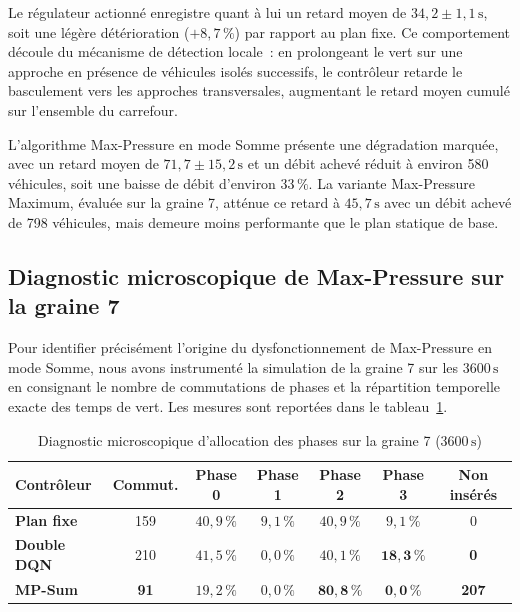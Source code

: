 \documentclass[11pt,a4paper]{article}
\begin{document}
Le régulateur actionné enregistre quant à lui un retard moyen de $34{,}2 \pm 1{,}1\,\mathrm{s}$, soit une légère détérioration ($+8{,}7\,\%$) par rapport au plan fixe. Ce comportement découle du mécanisme de détection locale~: en prolongeant le vert sur une approche en présence de véhicules isolés successifs, le contrôleur retarde le basculement vers les approches transversales, augmentant le retard moyen cumulé sur l'ensemble du carrefour.

L'algorithme Max-Pressure en mode Somme présente une dégradation marquée, avec un retard moyen de $71{,}7 \pm 15{,}2\,\mathrm{s}$ et un débit achevé réduit à environ 580 véhicules, soit une baisse de débit d'environ $33\,\%$. La variante Max-Pressure Maximum, évaluée sur la graine 7, atténue ce retard à $45{,}7\,\mathrm{s}$ avec un débit achevé de 798 véhicules, mais demeure moins performante que le plan statique de base.

\subsection{Diagnostic microscopique de Max-Pressure sur la graine 7}
\label{subsec:diagnostic}

Pour identifier précisément l'origine du dysfonctionnement de Max-Pressure en mode Somme, nous avons instrumenté la simulation de la graine 7 sur les $3600\,\mathrm{s}$ en consignant le nombre de commutations de phases et la répartition temporelle exacte des temps de vert. Les mesures sont reportées dans le tableau~\ref{tab:diagnostic_phases}.

\begin{table}[t]
\centering
\caption{Diagnostic microscopique d'allocation des phases sur la graine 7 ($3600\,\mathrm{s}$)}
\label{tab:diagnostic_phases}
\vspace{0.2cm}
\begin{tabular}{lcccccc}
\toprule
\textbf{Contrôleur} & \textbf{Commut.} & \textbf{Phase 0} & \textbf{Phase 1} & \textbf{Phase 2} & \textbf{Phase 3} & \textbf{Non insérés} \\
\midrule
\textbf{Plan fixe} & 159 & $40{,}9\,\%$ & $9{,}1\,\%$ & $40{,}9\,\%$ & $9{,}1\,\%$ & 0 \\
\textbf{Double DQN} & 210 & $41{,}5\,\%$ & $0{,}0\,\%$ & $40{,}1\,\%$ & $\mathbf{18{,}3\,\%}$ & \textbf{0} \\
\textbf{MP-Sum} & \textbf{91} & $19{,}2\,\%$ & $0{,}0\,\%$ & $\mathbf{80{,}8\,\%}$ & $\mathbf{0{,}0\,\%}$ & \textbf{207} \\
\bottomrule
\end{tabular}
\end{table}
\end{document}
